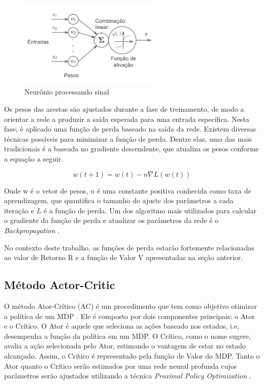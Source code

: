 \begin{figure}[H]
     \centering
     \includegraphics[width=0.6\textwidth]{figuras/ActivationFunc.png}
     \caption{Neurônio processando sinal \cite{Figueiredo}}
\end{figure}

Os pesos das arestas são ajustados durante a fase de treinamento,  de modo a orientar a rede a produzir a saída esperada para uma entrada específica. 
Nesta fase, é aplicado uma função de perda baseado na saída da rede. 
Existem diversas técnicas possíveis para minimizar a função de perda. 
Dentre elas, uma das mais tradicionais é a baseada no gradiente descendente, que atualiza os pesos conforme a equação a seguir. 

\begin{equation}
    w(t +1) = w(t) - n\nabla L(w(t)) 
\end{equation}

Onde w é o vetor de pesos, $n$ é uma constante positiva conhecida como taxa de aprendizagem, 
que quantifica o tamanho do ajuste dos parâmetros a cada iteração e $L$ é a função de perda. 
Um dos algoritmo mais utilizados para calcular o gradiente da função de perda e atualizar os parâmetros da rede é o \textit{Backpropagation} \cite{Bishop}. 

No contexto deste trabalho, as funções de perda estarão fortemente relacionadas ao valor de Retorno R e a função de Valor V apresentadas na seção anterior. 


\subsection{Método Actor-Critic}

O método Ator-Crítico (AC) é um procedimento que tem como objetivo otimizar a política de um MDP \cite{AC}. 
Ele é composto por dois componentes principais: o Ator e o Crítico. 
O Ator é aquele que seleciona as ações baseado nos estados, i.e, desempenha a função da política em um MDP. 
O Crítico, como o nome sugere, avalia a ação selecionada pelo Ator, estimando o vantagem de estar no estado alcançado. 
Assim, o Crítico é representado pela função de Valor do MDP. 
Tanto o Ator quanto o Crítico serão estimados por uma rede neural profunda cujos parâmetros serão ajustados utilizando a técnica \textit{Proximal Policy Optimization} \cite{PPO}.


